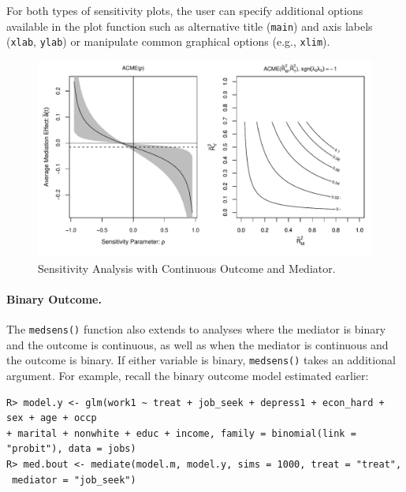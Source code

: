 \documentclass[11pt,letterpaper]{article}
\theoremstyle{plain}
\begin{document}
For both types of sensitivity plots, the user can specify additional options 
available in the plot function such as alternative
title (\texttt{main}) and axis labels (\texttt{xlab}, \texttt{ylab}) or 
manipulate common graphical options (e.g., \texttt{xlim}).



\begin{figure}[t]
\vspace{-.5in}
\begin{center}
\includegraphics[scale=.8]{Rho-R2-ContCont-JOBS.pdf}
\end{center}
\vspace{-.5in}
\caption{Sensitivity Analysis with Continuous Outcome and Mediator.
  \label{jobplot1}}
\end{figure}


\paragraph{Binary Outcome.}

The \texttt{medsens()} function also extends to analyses where the
mediator is binary and the outcome is continuous, as well as when the
mediator is continuous and the outcome is binary.  If either variable
is binary, \texttt{medsens()} takes an additional argument.  For
example, recall the binary outcome model estimated earlier:
\begin{verbatim}
R> model.y <- glm(work1 ~ treat + job_seek + depress1 + econ_hard + sex + age + occp
+ marital + nonwhite + educ + income, family = binomial(link = "probit"), data = jobs)
R> med.bout <- mediate(model.m, model.y, sims = 1000, treat = "treat",
 mediator = "job_seek")
\end{verbatim}
\end{document}
